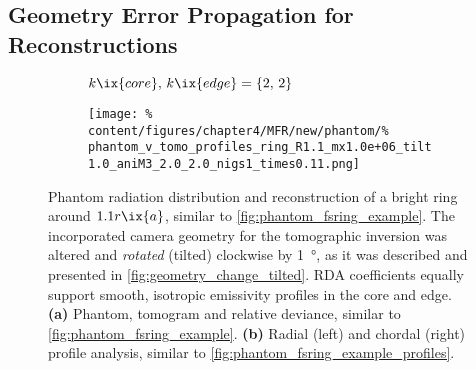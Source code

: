         \subsection{Geometry Error Propagation for Reconstructions}\label{eq:tomo_geo_error}%
%
            \begin{figure}[t]%
                \centering%
                \begin{subfigure}{\textwidth}%
                    \centering%
                    \caption{$k\ix{core},\,k\ix{edge}=\left\{2,\,2\right\}$}%
                \end{subfigure}%
                \newline%
                \begin{subfigure}{\textwidth}%
                    \centering%
                    \texttt{[image: \%
                        content/figures/chapter4/MFR/new/phantom/\%
                        phantom\_v\_tomo\_profiles\_ring\_R1.1\_mx1.0e+06\_tilt1.0\_aniM3\_2.0\_2.0\_nigs1\_times0.11.png]}%
                    \caption{}%
                \end{subfigure}%
                \caption{Phantom radiation distribution and reconstruction of a bright ring around $1.1r\ix{a}$, similar to \cref{fig:phantom_fsring_example}. The incorporated camera geometry  for the tomographic inversion was altered and \textit{rotated} (tilted) clockwise by \SI{1}{\degree}, as it was described and presented in \cref{fig:geometry_change_tilted}. RDA coefficients equally support smooth, isotropic emissivity profiles in the core and edge. \textbf{(a)} Phantom, tomogram and relative deviance, similar to \cref{fig:phantom_fsring_example}. \textbf{(b)} Radial (left) and chordal (right) profile analysis, similar to \cref{fig:phantom_fsring_example_profiles}.}\label{fig:phantom_fsring_tilt_1deg}%
            \end{figure}%
%
